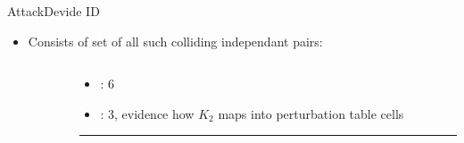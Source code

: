 \documentclass[aspectratio=169, hyperref={colorlinks=true, allcolors=SecondaryColor}, c]{beamer}
\begin{document}
\begin{frame}[fragile]{Attack}{Devide ID}
	\begin{itemize}
		\item Consists of set of all such colliding \alert{independant} pairs:
	\end{itemize}
	\vspace{0.5cm}
	\begin{columns}
		\begin{column}{0.6\textwidth}
			\begin{adjustbox}{max width=\textwidth}
			\end{adjustbox}
		\end{column}
		\begin{column}{0.4\textwidth}
			\begin{itemize}
				\item {}: 6
				\item {}: 3, evidence how $K_2$ maps into \alert{perturbation table} cells%
			\end{itemize}

			\begin{center}
				\vspace{-0.1cm}
				\color{PrimaryColor}\rule{0.9\textwidth}{0.25mm}
			\end{center}


\end{column}
\end{columns}
\end{frame}
\end{document}
